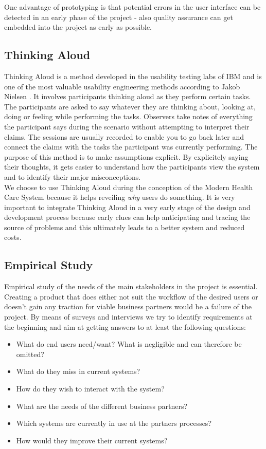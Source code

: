 \documentclass[a4paper,11pt]{article}
\begin{document}
One advantage of prototyping is that potential errors in the user interface can be detected in an early phase of the project - also quality assurance can get embedded into the project as early as possible.

\subsection{Thinking Aloud}
\label{subsect:think_aloud}

Thinking Aloud is a method developed in the usability testing labs of IBM and is one of the most valuable usability engineering methods according to Jakob Nielsen \citep[Page 195ff]{nielsen1994}. It involves participants thinking aloud as they perform certain tasks. The participants are asked to say whatever they are thinking about, looking at, doing or feeling while performing the tasks. Observers take notes of everything the participant says during the scenario without attempting to interpret their claims. The sessions are usually recorded to enable you to go back later and connect the claims with the tasks the participant was currently performing. The purpose of this method is to make assumptions explicit. By explicitely saying their thoughts, it gets easier to understand how the participants view the system and to identify their major misconceptions. \\

We choose to use Thinking Aloud during the conception of the Modern Health Care System because it helps reveiling \emph{why} users do something. It is very important to integrate Thinking Aloud in a very early stage of the design and development process because early clues can help anticipating and tracing the source of problems and this ultimately leads to a better system and reduced costs.

\subsection{Empirical Study}
\label{subsect:emp_study}

Empirical study of the needs of the main stakeholders in the project is essential. Creating a product that does either not suit the workflow of the desired users or doesn't gain any traction for viable business partners would be a failure of the project. By means of surveys and interviews we try to identify requirements at the beginning and aim at getting answers to at least the following questions:

\begin{itemize}
\item What do end users need/want? What is negligible and can therefore be omitted?
\item What do they miss in current systems?
\item How do they wish to interact with the system?
\item What are the needs of the different business partners?
\item Which systems are currently in use at the partners processes?
\item How would they improve their current systems?
\end{itemize}
\end{document}

